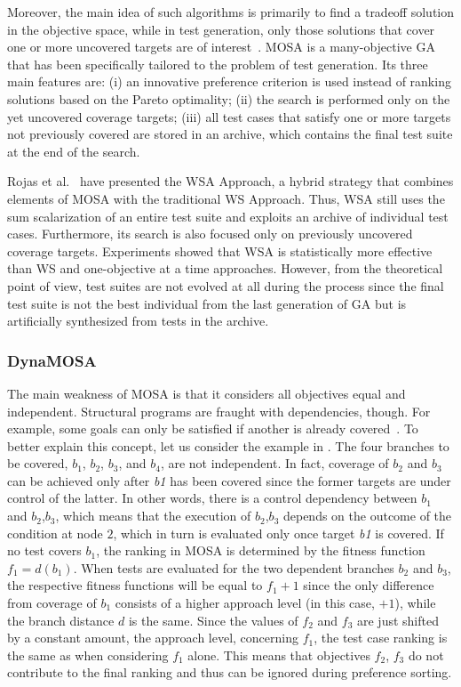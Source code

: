 \documentclass[paper=a4,%
  twoside,%
  BCOR4mm,%
  abstract=true,%
  toc=bibliography,%
  chapterprefix=true,%
  toc=bibliographynumbered,%
  open=right,%
  english,%
  pagesize=pdftex]{scrreprt}
\begin{document}
Moreover, the main idea of such algorithms is primarily to find a tradeoff solution in the objective space, while in test generation, only those solutions that cover one or more uncovered targets are of interest~\cite{Panichella2018}. \ac{MOSA} is a many-objective \ac{GA} that has been specifically tailored to the problem of test generation. Its three main features are: (i) an innovative preference criterion is used instead of ranking solutions based on the Pareto optimality; (ii) the search is performed only on the yet uncovered coverage targets; (iii) all test cases that satisfy one or more targets not previously covered are stored in an archive, which contains the final test suite at the end of the search. 

Rojas et al.~\cite{Rojas2017} have presented the \ac{WSA} Approach, a hybrid strategy that combines elements of \ac{MOSA} with the traditional \ac{WS} Approach. Thus, \ac{WSA} still uses the sum scalarization of an entire test suite and exploits an archive of individual test cases. Furthermore, its search is also focused only on previously uncovered coverage targets. Experiments showed that \ac{WSA} is statistically more effective than \ac{WS} and one-objective at a time approaches. However, from the theoretical point of view, test suites are not evolved at all during the process since the final test suite is not the best individual from the last generation of \ac{GA} but is artificially synthesized from tests in the archive.

\subsubsection{DynaMOSA}
The main weakness of \ac{MOSA} is that it considers all objectives equal and independent. Structural programs are fraught with dependencies, though. For example, some goals can only be satisfied if another is already covered~\cite{Fraser_2013}. To better explain this concept, let us consider the example in . The four branches to be covered, $b_1$, $b_2$, $b_3$, and $b_4$, are not independent. In fact, coverage of $b_2$ and $b_3$ can be achieved only after \emph{b1} has been covered since the former targets are under control of the latter. In other words, there is a control dependency between $b_1$ and $b_2$,$b_3$, which means that the execution of $b_2$,$b_3$ depends on the outcome of the condition at node $2$, which in turn is evaluated only once target \emph{b1} is covered. If no test covers $b_1$, the ranking in \ac{MOSA} is determined by the fitness function $f_1 = d(b_1)$. When tests are evaluated for the two dependent branches $b_2$ and $b_3$, the respective fitness functions will be equal to $f_1 + 1$ since the only difference from coverage of $b_1$ consists of a higher approach level (in this case, $+1$), while the branch distance $d$ is the same. Since the values of $f_2$ and $f_3$ are just shifted by a constant amount, the approach level, concerning $f_1$, the test case ranking is the same as when considering $f_1$ alone. This means that objectives $f_2$, $f_3$ do not contribute to the final ranking and thus can be ignored during preference sorting.
\end{document}
